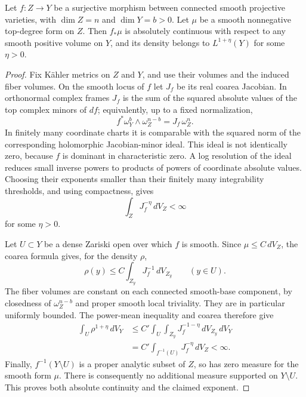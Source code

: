 \begin{lemma}\label{coa:coarea}
Let $f:Z\to Y$ be a surjective morphism between connected smooth projective
varieties, with $\dim Z=n$ and $\dim Y=b>0$.  Let $\mu$ be a smooth
nonnegative top-degree form on $Z$.  Then $f_*\mu$ is absolutely continuous
with respect to any smooth positive volume on $Y$, and its density belongs
to $L^{1+\eta}(Y)$ for some $\eta>0$.
\end{lemma}

\begin{proof}
Fix K\"ahler metrics on $Z$ and $Y$, and use their volumes and the induced
fiber volumes.  On the smooth locus of $f$ let $J_f$ be its real coarea
Jacobian.  In orthonormal complex frames $J_f$ is the sum of the squared
absolute values of the top complex minors of $df$; equivalently, up to a
fixed normalization,
\[
 f^*\omega_Y^b\wedge\omega_Z^{n-b}=J_f\,\omega_Z^n.
\]
In finitely many coordinate charts it is comparable with the squared
norm of the corresponding holomorphic Jacobian-minor ideal.  This ideal
is not identically zero, because $f$ is dominant in characteristic zero.
A log resolution of the ideal reduces small inverse powers to products
of powers of coordinate absolute values.  Choosing their exponents
smaller than their finitely many integrability thresholds, and using
compactness, gives
\begin{equation}\label{coa:inverse-jacobian}
 \int_Z J_f^{-\eta}\,dV_Z<\infty
\end{equation}
for some $\eta>0$.

Let $U\subset Y$ be a dense Zariski open over which $f$ is smooth.  Since
$\mu\leq C\,dV_Z$, the coarea formula gives, for the density $\rho$,
\[
 \rho(y)\leq C\int_{Z_y}J_f^{-1}\,dV_{Z_y}
 \qquad (y\in U).
\]
The fiber volumes are constant on each connected smooth-base component,
by closedness of $\omega_Z^{n-b}$ and proper smooth local triviality.
They are in particular uniformly bounded.  The power-mean inequality
and coarea therefore give
\begin{equation}\label{coa:density-estimate}
 \begin{split}
 \int_U\rho^{1+\eta}\,dV_Y
 &\leq C'\int_U\int_{Z_y}J_f^{-1-\eta}\,dV_{Z_y}\,dV_Y\\
 &=C'\int_{f^{-1}(U)}J_f^{-\eta}\,dV_Z<\infty.
 \end{split}
\end{equation}
Finally, $f^{-1}(Y\setminus U)$ is a proper analytic subset of $Z$, so
has zero measure for the smooth form $\mu$.  There is consequently no
additional measure supported on $Y\setminus U$.  This proves both
absolute continuity and the claimed exponent.
\end{proof}

